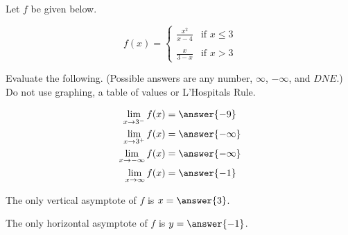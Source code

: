 \documentclass{ximera}
\author{Nela Lakos \and Kyle Parsons}
\begin{document}
\begin{exercise}

Let $f$ be given below.

\[
f(x) = 
\begin{cases}
\frac{x^2}{x-4} & \text{if } x\leq3\\ \\
\frac{x}{3-x} & \text{if } x>3
\end{cases}
\]

Evaluate the following.  (Possible answers are any number, $\infty$, $-\infty$, and $DNE$.)  Do not use graphing, a table of values or L'Hospitals Rule.

\begin{align*}
\lim_{x\to3^-}f(x) &= \answer{-9}\\
\lim_{x\to3^+}f(x) &= \answer{-\infty}\\
\lim_{x\to-\infty}f(x) &= \answer{-\infty}\\
\lim_{x\to\infty}f(x) &= \answer{-1}
\end{align*}

\begin{exercise}

The only vertical asymptote of $f$ is $x=\answer{3}$.

\begin{exercise}

The only horizontal asymptote of $f$ is $y=\answer{-1}$.

\end{exercise}
\end{exercise}
\end{exercise}
\end{document}
